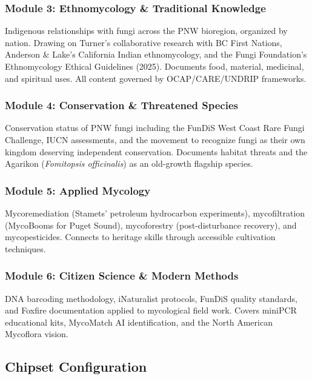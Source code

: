 \documentclass[11pt,letterpaper]{article}
\begin{document}
\subsubsection{Module 3: Ethnomycology \& Traditional Knowledge}

Indigenous relationships with fungi across the PNW bioregion, organized by nation. Drawing on Turner's collaborative research with BC First Nations, Anderson \& Lake's California Indian ethnomycology, and the Fungi Foundation's Ethnomycology Ethical Guidelines (2025). Documents food, material, medicinal, and spiritual uses. All content governed by OCAP/CARE/UNDRIP frameworks.

\subsubsection{Module 4: Conservation \& Threatened Species}

Conservation status of PNW fungi including the FunDiS West Coast Rare Fungi Challenge, IUCN assessments, and the movement to recognize fungi as their own kingdom deserving independent conservation. Documents habitat threats and the Agarikon (\textit{Fomitopsis officinalis}) as an old-growth flagship species.

\subsubsection{Module 5: Applied Mycology}

Mycoremediation (Stamets' petroleum hydrocarbon experiments), mycofiltration (MycoBooms for Puget Sound), mycoforestry (post-disturbance recovery), and mycopesticides. Connects to heritage skills through accessible cultivation techniques.

\subsubsection{Module 6: Citizen Science \& Modern Methods}

DNA barcoding methodology, iNaturalist protocols, FunDiS quality standards, and Foxfire documentation applied to mycological field work. Covers miniPCR educational kits, MycoMatch AI identification, and the North American Mycoflora vision.

\subsection{Chipset Configuration}
\end{document}

